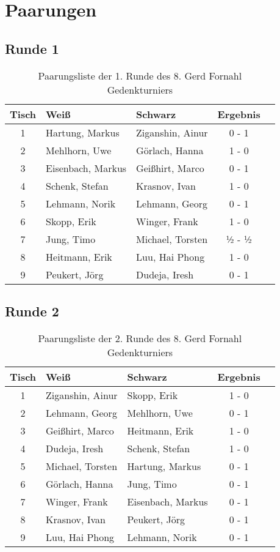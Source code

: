 \documentclass[a4paper,ngerman]{tui-algo-seminar}
\begin{document}
\section{Paarungen}
\subsection{Runde 1}
\begin{table}[H]
\centering
\caption{Paarungsliste der 1. Runde des 8. Gerd Fornahl Gedenkturniers}
\begin{tabular}{cllcl}
\toprule
\textbf{Tisch} & \textbf{Weiß} & \textbf{Schwarz} & \textbf{Ergebnis} \\
\midrule
1 & Hartung, Markus & Ziganshin, Ainur & 0 - 1 \\
2 & Mehlhorn, Uwe & Görlach, Hanna & 1 - 0 \\
3 & Eisenbach, Markus & Geißhirt, Marco & 0 - 1 \\
4 & Schenk, Stefan & Krasnov, Ivan & 1 - 0 \\
5 & Lehmann, Norik & Lehmann, Georg & 0 - 1 \\
6 & Skopp, Erik & Winger, Frank & 1 - 0 \\
7 & Jung, Timo & Michael, Torsten & ½ - ½ \\
8 & Heitmann, Erik & Luu, Hai Phong & 1 - 0 \\
9 & Peukert, Jörg & Dudeja, Iresh & 0 - 1 \\
\bottomrule
\end{tabular}
\end{table}

\subsection{Runde 2}
\begin{table}[H]
\centering
\caption{Paarungsliste der 2. Runde des 8. Gerd Fornahl Gedenkturniers}
\begin{tabular}{cllcl}
\toprule
\textbf{Tisch} & \textbf{Weiß} & \textbf{Schwarz} & \textbf{Ergebnis} \\
\midrule
1 & Ziganshin, Ainur & Skopp, Erik & 1 - 0 \\
2 & Lehmann, Georg & Mehlhorn, Uwe & 0 - 1 \\
3 & Geißhirt, Marco & Heitmann, Erik & 1 - 0 \\
4 & Dudeja, Iresh & Schenk, Stefan & 1 - 0 \\
5 & Michael, Torsten & Hartung, Markus & 0 - 1 \\
6 & Görlach, Hanna & Jung, Timo & 0 - 1 \\
7 & Winger, Frank & Eisenbach, Markus & 0 - 1 \\
8 & Krasnov, Ivan & Peukert, Jörg & 0 - 1 \\
9 & Luu, Hai Phong & Lehmann, Norik & 0 - 1 \\
\bottomrule
\end{tabular}
\end{table}
\end{document}
